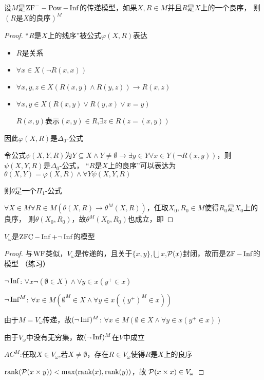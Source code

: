 \documentclass[11pt]{article}
\begin{document}
\begin{lemma}[\(\ZFm\)]
设\(M\)是\(\text{ZF}^--\operatorname{Pow}-\operatorname{Inf}\)的传递模型，如果\(X,R\in M\)并且\(R\)是\(X\)上的一个良序，
则\((R\text{是$X$的良序})^M\)
\end{lemma}

\begin{proof}
“\(R\)是\(X\)上的线序”被公式\(\varphi(X,R)\)表达
\begin{itemize}
\item \(R\)是关系
\item \(\forall x\in X(\neg R(x,x))\)
\item \(\forall x,y,z\in X(R(x,y)\wedge R(y,z))\to R(x,z)\)
\item \(\forall x,y\in X(R(x,y)\vee R(y,x)\vee x=y)\)

\(R(x,y)\)表示\((x,y)\in R\),\(\exists z\in R(z=(x,y))\)
\end{itemize}


因此\(\varphi(X,R)\)是\(\Delta_0\)-公式

令公式\(\psi(X,Y,R)\)为\(Y\subseteq X\wedge Y\neq\emptyset\to\exists y\in Y\forall x\in Y(\neg R(x,y))\)，则\(\psi(X,Y,R)\)是\(\Delta_0\)-公式，
“\(R\)是\(X\)上的良序”可以表达为\(\theta(X,Y)=\varphi(X,R)\wedge\forall Y\psi(X,Y,R)\)

则\(\theta\)是一个\(\Pi_1\)-公式

\(\forall X\in  M\forall R\in M(\theta(X,R)\to\theta^M(X,R))\)，任取\(X_0,R_0\in M\)使得\(R_0\)是\(X_0\)上的良序，
则\(\theta(X_0,R_0)\)，故\(\theta^M(X_0,R_0)\)也成立，即
\end{proof}

\begin{theorem}[\(\ZFm\)]
\(V_\omega\)是\(\operatorname{ZFC}-\operatorname{Inf}+\neg\operatorname{Inf}\)的模型
\end{theorem}

\begin{proof}
与\(\operatorname{WF}\)类似，\(V_\omega\)是传递的，且关于\(\{x,y\}\),\(\bigcup x\),\(\mathcal{P}(x)\)封闭，故而是\(\operatorname{ZF}-\operatorname{Inf}\)的模型
（练习）

\(\neg\operatorname{Inf}\): \(\forall x\neg(\emptyset\in X)\wedge\forall y\in x(y^+\in x)\)

\(\neg\operatorname{Inf}^M\): \(\forall x\in M(\emptyset^M\in X\wedge\forall y\in x((y^+)^M\in x))\)

由于\(M=V_\omega\)传递，故\((\neg\operatorname{Inf})^M\): \(\forall x\in M(\emptyset\in X\wedge\forall y\in x(y^+\in x))\)

由于\(V_\omega\)中没有无穷集，故\((\neg\operatorname{Inf})^M\)在\(V\)中成立

\(AC^M\):任取\(X\in V_\omega\),若\(X\neq\emptyset\)，存在\(R\in V_\omega\)使得\(R\)是\(X\)上的良序

\(\text{rank}(\mathcal{P}(x\times y))<\max(\text{rank}(x),\text{rank}(y))\)，故
\(\mathcal{P}(x\times x)\in V_\omega\)
\end{proof}
\end{document}
